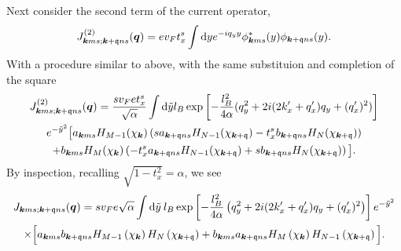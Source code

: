 Next consider the second term of the current operator,
\begin{equation}
  \label{eq:103}
  J_{\bm{k} m s; \bm{k} + \mathfrak{q} n s}^{(2)} (\bm{q}) =
  e v_{F} t^s_{x}
  \int \mathrm{d} y
  e^{-iq_{y} y}
  \phi ^{*}_{\bm{k} m s}(y)  \phi _{\bm{k} + \mathfrak{q} n s}(y).
\end{equation}
With a procedure similar to above, with the same substituion and completion of the square
\begin{multline}
  \label{eq:105}
  J_{\bm{k} m s; \bm{k} + \mathfrak{q} n s}^{(2)} (\bm{q}) =
  \frac{s v_F e t^s_x}{\sqrt{\alpha}}
  \int \mathrm{d} \tilde{y} l_B
    \exp \left[
      -\frac{l_{B}^2}{4 \alpha } (q_{y}^2 + 2i (2 k'_x + q' _x) q_{y}  + (q'_x)^2 )
    \right]\\
  e^{-\tilde{y}^2} \big[
    a_{\bm{k} m s} H_{M-1}( \chi _{\bm{k}} ) \left(s a_{\bm{k} + \mathfrak{q} n s} H_{N-1}( \chi _{\bm{k} + \mathfrak{q}} ) - t^s_{x} b_{\bm{k} + \mathfrak{q} n s} H_{N}( \chi _{\bm{k} + \mathfrak{q}} ) \right)\\
   +
    b_{\bm{k} m s} H_{M}( \chi _{\bm{k}} ) \left(- t^s_{x} a_{\bm{k} + \mathfrak{q} n s} H_{N-1}( \chi _{\bm{k} + \mathfrak{q}} ) + s b_{\bm{k} + \mathfrak{q} n s} H_{N}( \chi _{\bm{k} + \mathfrak{q}} ) \right)
    \big].
\end{multline}
By inspection,  recalling \( \sqrt{1 - t_x^2} = \alpha \), we see
\begin{multline}
J_{\bm{k}ms; \bm{k}+\mathfrak{q} ns}(\bm{q}) =
  s v_F e \sqrt{\alpha} \int \mathrm{d}\tilde{y} \: l_B
  \exp \left[
    -\frac{l_{B}^2}{4 \alpha } \left(q_{y}^2 + 2i (2 k' _x + q' _x) q_{y} + (q'_x)^2 \right)
  \right]
  e^{-\tilde{y}^2}
  \\
  \times
  \Big[
  a_{\bm{k}ms}b_{\bm{k} + \mathfrak{q} ns}
  H_{M-1} \left(  \chi_{\bm{k}} \right)
  H_N\left( \chi_{\bm{k} + \mathfrak{q}} \right)
  +
  b_{\bm{k}ms} a_{\bm{k} + \mathfrak{q} ns}
  H_M \left( \chi_{\bm{k}} \right)
  H_{N-1} \left( \chi_{\bm{k} + \mathfrak{q}} \right)
  \Big].
\end{multline}

